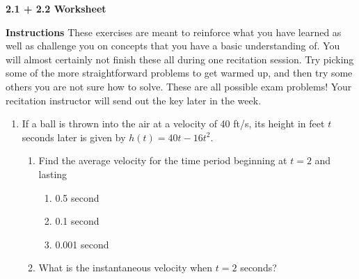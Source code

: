 \documentclass[11pt]{article}
\begin{document}

\centerline{\textbf{\Large{2.1 + 2.2 Worksheet}}}

\vspace{0.2in}

{\bf Instructions} These exercises are meant to reinforce what you have learned as well as challenge you on concepts that you have a basic understanding of. You will almost certainly not finish these all during one recitation session. Try picking some of the more straightforward problems to get warmed up, and then try some others you are not sure how to solve. These are all possible exam problems! Your recitation instructor will send out the key later in the week. 


\begin{enumerate}

\item If a ball is thrown into the air at a velocity of 40 ft/s, its height in feet $t$ seconds later is given by $h(t)=40t-16t^2$.

\begin{enumerate}

\item Find the average velocity for the time period beginning at $t=2$ and lasting  

\begin{enumerate}

\item 0.5 second\\


\item 0.1 second\\


\item 0.001 second\\


\end{enumerate}



\item What is the instantaneous velocity when $t=2$ seconds?\\





\end{enumerate}
\end{enumerate}
\end{document}
